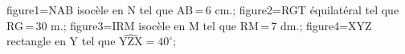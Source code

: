 \documentclass[exercice]{thedocument}%
\begin{document}
%
    \>figure1=NAB isocèle en N tel que AB\,=\,6 cm.;%
    \>figure2=RGT équilatéral tel que RG\,=\,30 m.;%
    \>figure3=IRM isocèle en M tel que RM\,=\,7 dm.;%
    \>figure4=XYZ rectangle en Y tel que $\widehat{\text{YZX}}=40^\circ$;%
\end{document}
